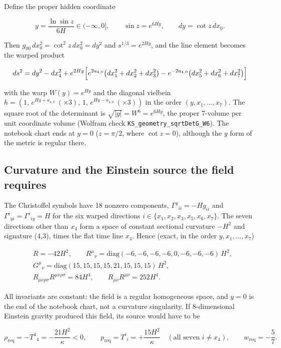 \documentclass[11pt]{article}
\begin{document}
Define the proper hidden coordinate

\[
y=\frac{\ln\sin z}{6H}\in(-\infty,0],\qquad \sin z=e^{6Hy},\qquad dy=\cot z\,dx_0 .
\]

Then $g_{00}\,dx_0^2=\cot^2z\,dx_0^2=dy^2$ and $s^{1/3}=e^{2Hy}$, and the line element becomes the warped product

\[
ds^2=dy^2-dx_4^2+e^{2Hy}\Bigl[e^{2a_{4,0}}\bigl(dx_1^2+dx_2^2+dx_3^2\bigr)-e^{-2a_{4,0}}\bigl(dx_5^2+dx_6^2+dx_7^2\bigr)\Bigr]
\]

with the warp $W(y)=e^{Hy}$ and the diagonal vielbein $h=(1,\,e^{Hy+a_{4,0}}\ (\times3),\,1,\,e^{Hy-a_{4,0}}\ (\times3))$ in the order $(y,x_1,\dots,x_7)$. The square root of the determinant is $\sqrt{|g|}=W^6=e^{6Hy}$, the proper 7-volume per unit coordinate volume (Wolfram check \texttt{KS\_geome\allowbreak{}try\_sqrt\allowbreak{}DetG\_W6}). The notebook chart ends at $y=0$ ($z=\pi/2$, where $\cot z=0$), although the $y$ form of the metric is regular there.

\subsection{Curvature and the Einstein source the field requires}

The Christoffel symbols have 18 nonzero components, $\Gamma^y{}_{ii}=-Hg_{ii}$ and $\Gamma^i{}_{yi}=\Gamma^i{}_{iy}=H$ for the six warped directions $i\in\{x_1,x_2,x_3,x_5,x_6,x_7\}$. The seven directions other than $x_4$ form a space of constant sectional curvature $-H^2$ and signature (4,3), times the flat time line $x_4$. Hence (exact, in the order $y,x_1,\dots,x_7$)

\[
\begin{aligned}
&R=-42H^2,\qquad R^\mu{}_\nu=\mathrm{diag}(-6,-6,-6,-6,0,-6,-6,-6)\,H^2,\\
&G^\mu{}_\nu=\mathrm{diag}(15,15,15,15,21,15,15,15)\,H^2,\\
&R_{\mu\nu\rho\sigma}R^{\mu\nu\rho\sigma}=84H^4,\qquad R_{\mu\nu}R^{\mu\nu}=252H^4 .
\end{aligned}
\]

All invariants are constant: the field is a regular homogeneous space, and $y=0$ is the end of the notebook chart, not a curvature singularity. If 8-dimensional Einstein gravity produced this field, its source would have to be

\[
\rho_{\mathrm{req}}=-T^4{}_4=-\frac{21H^2}{\kappa}<0,\qquad p_{\mathrm{req}}=T^i{}_i=+\frac{15H^2}{\kappa}\quad(\text{all seven }i\ne x_4),\qquad w_{\mathrm{req}}=-\frac57 .
\]
\end{document}
